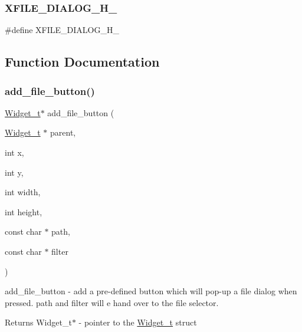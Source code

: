\subsubsection{\texorpdfstring{X\+F\+I\+L\+E\+\_\+\+D\+I\+A\+L\+O\+G\+\_\+\+H\+\_\+}{XFILE\_DIALOG\_H\_}}
{\footnotesize\ttfamily \#define X\+F\+I\+L\+E\+\_\+\+D\+I\+A\+L\+O\+G\+\_\+\+H\+\_\+}



\subsection{Function Documentation}
\mbox{\label{xfile-dialog_8h_aa38720181c2a046546d345b60eb6b7b0}} 
\subsubsection{\texorpdfstring{add\+\_\+file\+\_\+button()}{add\_file\_button()}}
{\footnotesize\ttfamily \hyperlink{structWidget__t}{Widget\+\_\+t}$\ast$ add\+\_\+file\+\_\+button (\begin{DoxyParamCaption}\item[{\hyperlink{structWidget__t}{Widget\+\_\+t} $\ast$}]{parent,  }\item[{int}]{x,  }\item[{int}]{y,  }\item[{int}]{width,  }\item[{int}]{height,  }\item[{const char $\ast$}]{path,  }\item[{const char $\ast$}]{filter }\end{DoxyParamCaption})}



add\+\_\+file\+\_\+button -\/ add a pre-\/defined button which will pop-\/up a file dialog when pressed. path and filter will e hand over to the file selector. 

\begin{DoxyReturn}{Returns}
Widget\+\_\+t$\ast$ -\/ pointer to the \hyperlink{structWidget__t}{Widget\+\_\+t} struct 
\end{DoxyReturn}
\mbox{\label{xfile-dialog_8h_a50f41466d35761802fb415011006c6e6}} 
